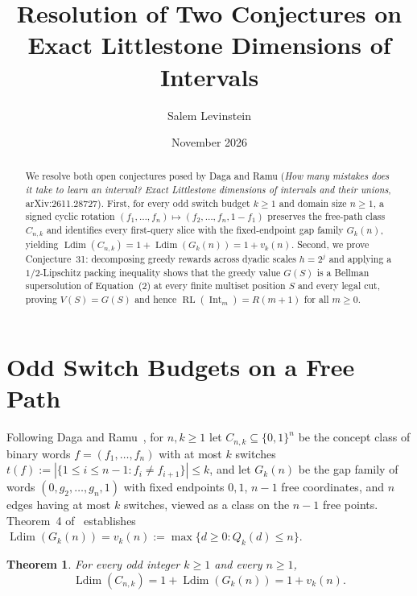 \documentclass[11pt]{article}
\title{Resolution of Two Conjectures on Exact Littlestone Dimensions of Intervals}
\author{Salem Levinstein}
\date{November 2026}
\newtheorem{theorem}{Theorem}
\newcommand{\Ldim}{\operatorname{Ldim}}
\newcommand{\RL}{\operatorname{RL}}
\newcommand{\Int}{\operatorname{Int}}
\begin{document}
\maketitle

\begin{abstract}
We resolve both open conjectures posed by Daga and Ramu (\emph{How many mistakes does it take to learn an interval? Exact Littlestone dimensions of intervals and their unions}, arXiv:2611.28727). First, for every odd switch budget $k \ge 1$ and domain size $n \ge 1$, a signed cyclic rotation $(f_1, \dots, f_n) \mapsto (f_2, \dots, f_n, 1 - f_1)$ preserves the free-path class $C_{n,k}$ and identifies every first-query slice with the fixed-endpoint gap family $G_k(n)$, yielding $\Ldim(C_{n,k}) = 1 + \Ldim(G_k(n)) = 1 + v_k(n)$. Second, we prove Conjecture~31: decomposing greedy rewards across dyadic scales $h = 2^j$ and applying a $1/2$-Lipschitz packing inequality shows that the greedy value $G(S)$ is a Bellman supersolution of Equation~(2) at every finite multiset position $S$ and every legal cut, proving $V(S) = G(S)$ and hence $\RL(\Int_m) = R(m + 1)$ for all $m \ge 0$.
\end{abstract}

\section{Odd Switch Budgets on a Free Path}

Following Daga and Ramu~\cite{DR2026}, for $n, k \ge 1$ let $C_{n,k} \subseteq \{0, 1\}^n$ be the concept class of binary words $f = (f_1, \dots, f_n)$ with at most $k$ switches $t(f) := |\{1 \le i \le n - 1 : f_i \neq f_{i+1}\}| \le k$, and let $G_k(n)$ be the gap family of words $(0, g_2, \dots, g_n, 1)$ with fixed endpoints $0, 1$, $n - 1$ free coordinates, and $n$ edges having at most $k$ switches, viewed as a class on the $n - 1$ free points. Theorem~4 of~\cite{DR2026} establishes $\Ldim(G_k(n)) = v_k(n) := \max\{d \ge 0 : Q_k(d) \le n\}$.

\begin{theorem}\label{thm:odd}
For every odd integer $k \ge 1$ and every $n \ge 1$,
\[
\Ldim(C_{n,k}) = 1 + \Ldim(G_k(n)) = 1 + v_k(n).
\]
\end{theorem}
\end{document}
